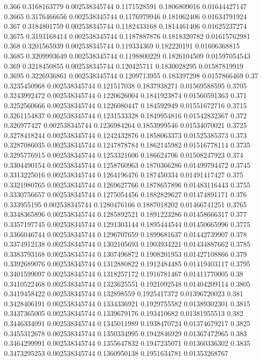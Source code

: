 {0.366 0.3168163779 0.002538345744 0.1171528591 0.1806809016 0.01644427147
0.3665 0.3176466656 0.002538345744 0.1176979946 0.181062406 0.01634791924
0.367 0.3184801759 0.002538345744 0.1182433168 0.1814461406 0.01625237274
0.3675 0.3193168414 0.002538345744 0.1187887876 0.1818320782 0.01615762981
0.368 0.3201565939 0.002538345744 0.119334369 0.182220191 0.01606368815
0.3685 0.3209993649 0.002538345744 0.1198800229 0.1826104509 0.01597054543
0.369 0.3218450855 0.002538345744 0.120425711 0.1830028295 0.01587819919
0.3695 0.3226936861 0.002538345744 0.1209713955 0.183397298 0.0157866469
0.37 0.3235450968 0.002538345744 0.121517038 0.1837938271 0.01569588595
0.3705 0.3243992472 0.002538345744 0.1220626004 0.1841923874 0.01560591363
0.371 0.3252560666 0.002538345744 0.1226080447 0.184592949 0.01551672716
0.3715 0.3261154837 0.002538345744 0.1231533328 0.1849954816 0.01542832367
0.372 0.326977427 0.002538345744 0.1236984264 0.1853999546 0.01534070021
0.3725 0.3278418244 0.002538345744 0.1242432876 0.1858063373 0.01525385373
0.373 0.3287086035 0.002538345744 0.1247878784 0.1862145982 0.01516778114
0.3735 0.3295776915 0.002538345744 0.1253321606 0.186624706 0.01508247923
0.374 0.3304490154 0.002538345744 0.1258760963 0.1870366286 0.01499794472
0.3745 0.3313225016 0.002538345744 0.1264196476 0.187450334 0.01491417427
0.375 0.3321980765 0.002538345744 0.1269627766 0.1878657896 0.01483116443
0.3755 0.3330756657 0.002538345744 0.1275054456 0.1882829627 0.01474891171
0.376 0.333955195 0.002538345744 0.1280476166 0.1887018202 0.01466741251
0.3765 0.3348365896 0.002538345744 0.1285892521 0.1891223286 0.01458666317
0.377 0.3357197745 0.002538345744 0.1291303144 0.1895444544 0.01450665996
0.3775 0.3366046744 0.002538345744 0.1296707659 0.1899681637 0.01442739907
0.378 0.3374912138 0.002538345744 0.1302105693 0.1903934221 0.01434887662
0.3785 0.3383793168 0.002538345744 0.1307496872 0.1908201953 0.01427108866
0.379 0.3392689076 0.002538345744 0.1312880822 0.1912484485 0.01419403117
0.3795 0.3401599097 0.002538345744 0.1318257172 0.1916781467 0.01411770005
0.38 0.3410522468 0.002538345744 0.1323625551 0.1921092548 0.01404209114
0.3805 0.3419458422 0.002538345744 0.132898559 0.1925417372 0.01396720023
0.381 0.3428406191 0.002538345744 0.1334336921 0.1929755582 0.01389302301
0.3815 0.3437365005 0.002538345744 0.1339679176 0.193410682 0.01381955513
0.382 0.3446334091 0.002538345744 0.1345011989 0.1938470724 0.01374679217
0.3825 0.3455312678 0.002538345744 0.1350334995 0.1942846929 0.01367472965
0.383 0.3464299991 0.002538345744 0.1355647832 0.1947235071 0.01360336302
0.3835 0.3473295253 0.002538345744 0.1360950138 0.1951634781 0.01353268767
}
